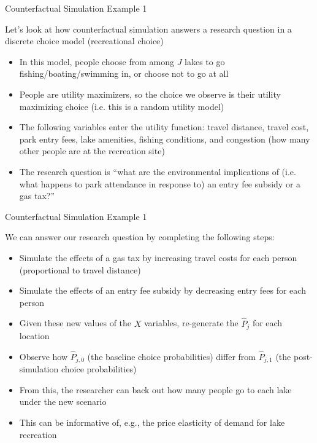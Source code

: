 \documentclass[english,xcolor=dvipsnames]{beamer}
\begin{document}
\begin{frame}{Counterfactual Simulation Example 1}

Let's look at how counterfactual simulation answers a research question
in a discrete choice model (recreational choice)
\begin{itemize}
\item In this model, people choose from among $J$ lakes to go fishing/boating/swimming
in, or choose not to go at all
\item People are utility maximizers, so the choice we observe is their utility
maximizing choice (i.e. this is a random utility model)
\item The following variables enter the utility function: travel distance,
travel cost, park entry fees, lake amenities, fishing conditions,
and congestion (how many other people are at the recreation site)
\item The research question is ``what are the environmental implications
of (i.e. what happens to park attendance in response to) an entry
fee subsidy or a gas tax?''
\end{itemize}

\end{frame}


\begin{frame}{Counterfactual Simulation Example 1}

We can answer our research question by completing the following steps:
\begin{itemize}
\item Simulate the effects of a gas tax by increasing travel costs for each
person (proportional to travel distance)
\item Simulate the effects of an entry fee subsidy by decreasing entry fees
for each person
\item Given these new values of the $X$ variables, re-generate the $\hat{P}_{j}$
for each location
\item Observe how $\hat{P}_{j,0}$ (the baseline choice probabilities) differ
from $\hat{P}_{j,1}$ (the post-simulation choice probabilities)
\item From this, the researcher can back out how many people go to each
lake under the new scenario
\item This can be informative of, e.g., the price elasticity of demand for
lake recreation
\end{itemize}

\end{frame}
\end{document}
